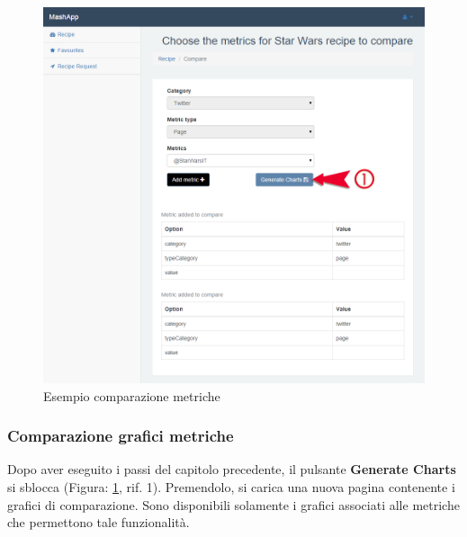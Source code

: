 			\begin{figure}[H]
				\centering
				\centerline{\includegraphics[width=14cm]{images/esempio_comparazione_metriche.png}}
				\caption{Esempio comparazione metriche}
				\label{fig:esempio_comparazione_metriche}
			\end{figure}


		\subsubsection{Comparazione grafici metriche} %
		\label{sec:comparazione_grafici_metriche}
			Dopo aver eseguito i passi del capitolo precedente, il pulsante \textbf{Generate Charts} si sblocca (Figura: \ref{fig:esempio_comparazione_metriche}, rif. 1). Premendolo, si carica una nuova pagina contenente i grafici di comparazione.\newline
			Sono disponibili solamente i grafici associati alle metriche\gloss{} che permettono tale funzionalità.



	\pagebreak
